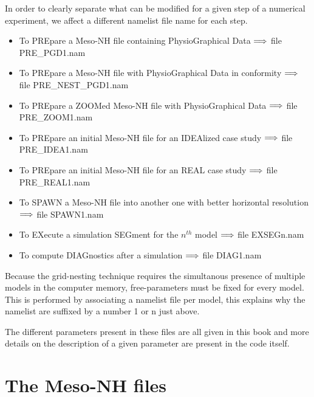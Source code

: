 In order to clearly separate what can be modified for a given step of a
numerical experiment, we affect a different namelist file name for each step.

\begin{itemize}
\item
To PREpare a Meso-NH file containing PhysioGraphical Data
\subitem  ${ \large \Longrightarrow } $ file PRE\_PGD1.nam 
\item
To PREpare a Meso-NH file with PhysioGraphical Data in conformity
\subitem  ${ \large \Longrightarrow } $ file PRE\_NEST\_PGD1.nam 
\item
To PREpare a ZOOMed Meso-NH file with PhysioGraphical Data
\subitem  ${ \large \Longrightarrow } $ file PRE\_ZOOM1.nam 
\item
To PREpare an initial Meso-NH file for an IDEAlized case study 
\subitem  ${ \large \Longrightarrow } $ file PRE\_IDEA1.nam 
\item
To PREpare an initial Meso-NH file for an REAL case study 
\subitem  ${ \large \Longrightarrow } $ file PRE\_REAL1.nam 
\item
To SPAWN a Meso-NH file into another one with better horizontal resolution
\subitem  ${ \large \Longrightarrow } $ file SPAWN1.nam 
\item
To EXecute a simulation SEGment for the $n ^{th} $ model
\subitem  ${ \large \Longrightarrow } $ file EXSEGn.nam
\item
To compute DIAGnostics after a simulation
\subitem  ${ \large \Longrightarrow } $ file DIAG1.nam
\end{itemize}


 Because the grid-nesting technique requires the simultanous presence
of multiple models in the computer memory, free-parameters 
must be fixed for every model. This is performed by associating a namelist 
file per model, this explains why the namelist are suffixed by a number 1 or n 
just above.


The different parameters present in these files are all given in this book 
 and more
details on the description of a given parameter are present in the code itself.


\section{The Meso-NH files}


